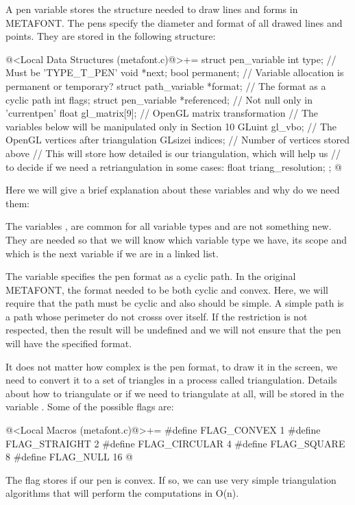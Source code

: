 
A pen variable stores the structure needed to draw lines and forms in
METAFONT. The pens specify the diameter and format of all drawed lines
and points. They are stored in the following structure:

\iniciocodigo
@<Local Data Structures (metafont.c)@>+=
struct pen_variable{
  int type; // Must be 'TYPE_T_PEN'
  void *next;
  bool permanent; // Variable allocation is permanent or temporary?
  struct path_variable *format; // The format as a cyclic path
  int flags;
  struct pen_variable *referenced; // Not null only in 'currentpen'
  float gl_matrix[9]; // OpenGL matrix transformation
  // The variables below will be manipulated only in Section 10
  GLuint gl_vbo; // The OpenGL vertices after triangulation
  GLsizei indices; // Number of vertices stored above
  // This will store how detailed is our triangulation, which will help us
  // to decide if we need a retriangulation in some cases:
  float triang_resolution;
};
@
\fimcodigo

Here we will give a brief explanation about these variables and why do
we need them:

The variables , 
are  common for all variable types and are not
something new. They are needed so that we will know which variable
type we have, its scope and which is the next variable if we are in a
linked list.

The variable  specifies the pen format as a cyclic
path. In the original METAFONT, the format needed to be both cyclic
and convex. Here, we will require that the path must be cyclic and
also should be simple. A simple path is a path whose perimeter do not
crosss over itself. If the restriction is not respected, then the
result will be undefined and we will not ensure that the pen will have
the specified format.

It does not matter how complex is the pen format, to draw it in the
screen, we need to convert it to a set of triangles in a process
called triangulation. Details about how to triangulate or if we need
to triangulate at all, will be stored in the
variable . Some of the possible flags are:

\iniciocodigo
@<Local Macros (metafont.c)@>+=
#define FLAG_CONVEX   1
#define FLAG_STRAIGHT 2
#define FLAG_CIRCULAR 4
#define FLAG_SQUARE   8
#define FLAG_NULL    16
@
\fimcodigo

The flag  stores if our pen is convex. If so,
we can use very simple triangulation algorithms that will perform the
computations in O(n).

